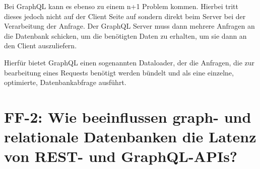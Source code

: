 \noindent
Bei GraphQL kann es ebenso zu einem n+1 Problem kommen. Hierbei tritt dieses jedoch nicht auf der Client Seite auf sondern direkt beim Server bei der Verarbeitung der Anfrage. Der GraphQL Server muss dann mehrere Anfragen an die Datenbank schicken, um die benötigten Daten zu erhalten, um sie dann an den Client auszuliefern.
\citep{graphqlsemantics}

\noindent
Hierfür bietet GraphQL einen sogenannten Dataloader, der die Anfragen, die zur bearbeitung eines Requests benötigt werden bündelt und als eine einzelne, optimierte, Datenbankabfrage ausführt. \citep{nordstrom2022graphql}

\section{FF-2: Wie beeinflussen graph- und relationale Datenbanken die Latenz von REST- und GraphQL-APIs?} %
\label{sec:ff2}







